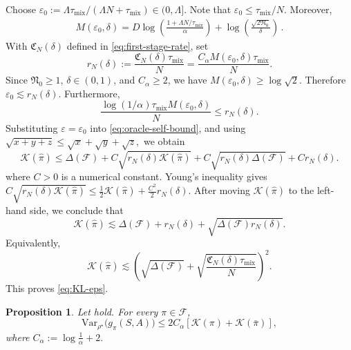 \documentclass{article}
\newtheorem{proposition}{Proposition}[section]
\theoremstyle{definition}
\theoremstyle{remark}
\theoremstyle{plain}
\newcommand{\Var}{\mathrm{Var}}
\def\eqsp{\,}
\numberwithin{equation}{section}
\begin{document}
Choose \(\varepsilon_0
    :=
    {
        \Lambda\tau_{\mathrm{mix}}
    }/(
        \Lambda N+\tau_{\mathrm{mix}}
    )\in (0,\Lambda]
\).
Note that
\(
    \varepsilon_0
    \leq
    {\tau_{\mathrm{mix}}}/{N}.
\)
Moreover,
\begin{align*}
    M(\varepsilon_0,\delta)
    =
    D\log\left(
        \frac{
            1+\Lambda N/\tau_{\mathrm{mix}}
        }{\alpha}
    \right)
    +
    \log\left(\frac{\sqrt{2\mathfrak N_0}}{\delta}\right)\eqsp.
\end{align*}
With \(\mathfrak C_N(\delta)\) defined in
\eqref{eq:first-stage-rate}, set
\[
    r_N(\delta)
    :=
    \frac{
        \mathfrak C_N(\delta)\tau_{\mathrm{mix}}
    }{N}
    =
    \frac{
        C_\alpha M(\varepsilon_0,\delta)
        \tau_{\mathrm{mix}}
    }{N}.
\] 
Since \(\mathfrak N_0\geq1\), \(\delta\in(0,1)\), and \(C_\alpha\geq2\),
we have
\(M(\varepsilon_0,\delta)\geq\log\sqrt{2}\). Therefore 
\(
    \varepsilon_0
    \lesssim
    r_N(\delta).
\)
Furthermore,
\[
    \frac{
        \log(1/\alpha)\tau_{\mathrm{mix}}
       M(\varepsilon_0,\delta)
    }{N}
    \leq
    r_N(\delta).
\]
Substituting \(\varepsilon=\varepsilon_0\) into
\eqref{eq:oracle-self-bound}, and using \(\sqrt{x+y+z}
    \leq
    \sqrt x+\sqrt y+\sqrt z,\) we obtain
\begin{equation}
\label{eq:oracle-self-bound-final}
    \mathcal K(\widehat\pi)
    \leq
    \Delta(\mathcal F)
    +
     C\sqrt{r_N(\delta)\mathcal K(\widehat\pi)}
    +
    C\sqrt{r_N(\delta)\Delta(\mathcal F)}
    +
    C r_N(\delta).
\end{equation}
where \(C>0\) is a numerical constant. Young's inequality gives
\(
    C\sqrt{r_N(\delta)\mathcal K(\widehat\pi)}
    \leq
    \frac12\mathcal K(\widehat\pi)
    +
    \frac{C^2}{2}r_N(\delta).
\)
After moving \(\mathcal K(\widehat\pi)\) to the left-hand side, we conclude that
\[
    \mathcal K(\widehat\pi)
    \lesssim
    \Delta(\mathcal F)
    +
    r_N(\delta)
    +
    \sqrt{
        \Delta(\mathcal F)r_N(\delta)
    }.
\]
Equivalently,
\begin{equation}
\label{eq:policy-oracle-final}
    \mathcal K(\widehat\pi)
    \lesssim
    \left(
        \sqrt{\Delta(\mathcal F)}
        +
        \sqrt{
            \frac{
                \mathfrak C_N(\delta)\tau_{\mathrm{mix}}
            }{N}
        }
    \right)^2.
\end{equation}
This proves \eqref{eq:KL-eps}.

\begin{proposition}
\label{prop:likelihood-ratio-variance}
Let  hold. For every \(\pi\in\mathcal F\), 
\[
    \Var_{\rho^\star}\bigl(g_\pi(S,A)\bigr)
    \leq
    2C_\alpha
    \left[
        \mathcal K(\pi)+\mathcal K(\bar\pi)
    \right], 
\]
where \(C_\alpha:=\log\frac1\alpha+2.\)
\end{proposition}
\end{document}
